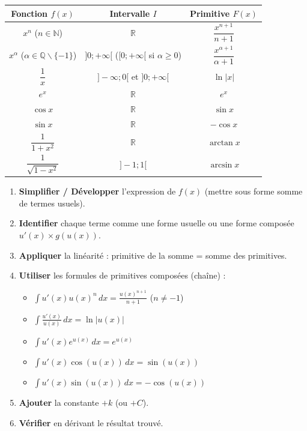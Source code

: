 \documentclass[11pt]{article}
\def\setminus{\mathbin{\backslash}}\let\smallsetminus\setminus
\begin{document}
\begin{aretenir}
\begin{center}
\begin{tabular}{|c|c|c|}\hline
Fonction $f(x)$ & Intervalle $I$ & Primitive $F(x)$ \\ \hline
$x^n$ ($n \in \mathbb{N}$) & $\mathbb{R}$ & $\dfrac{x^{n+1}}{n+1}$ \\ \hline
$x^\alpha$ ($\alpha \in \mathbb{Q}\setminus\{-1\}$) & $]0;+\infty[$ ($[0;+\infty[$ si $\alpha \ge 0$) & $\dfrac{x^{\alpha+1}}{\alpha+1}$ \\ \hline
$\dfrac{1}{x}$ & $]-\infty;0[$ et $]0;+\infty[$ & $\ln|x|$ \\ \hline
$e^x$ & $\mathbb{R}$ & $e^x$ \\ \hline
$\cos x$ & $\mathbb{R}$ & $\sin x$ \\ \hline
$\sin x$ & $\mathbb{R}$ & $-\cos x$ \\ \hline
$\dfrac{1}{1+x^2}$ & $\mathbb{R}$ & $\arctan x$ \\ \hline
$\dfrac{1}{\sqrt{1-x^2}}$ & $]-1;1[$ & $\arcsin x$ \\ \hline
\end{tabular}
\end{center}
\end{aretenir}

\begin{methode}
\begin{enumerate}
    \item \textbf{Simplifier / Développer} l'expression de $f(x)$ (mettre sous forme somme de termes usuels).
    \item \textbf{Identifier} chaque terme comme une forme usuelle ou une forme composée $u'(x) \times g(u(x))$.
    \item \textbf{Appliquer} la linéarité : primitive de la somme = somme des primitives.
    \item \textbf{Utiliser} les formules de primitives composées (chaîne) :
    \begin{itemize}
        \item $\int u'(x) u(x)^n \,dx = \frac{u(x)^{n+1}}{n+1}$ ($n \neq -1$)
        \item $\int \frac{u'(x)}{u(x)} \,dx = \ln|u(x)|$
        \item $\int u'(x) e^{u(x)} \,dx = e^{u(x)}$
        \item $\int u'(x) \cos(u(x)) \,dx = \sin(u(x))$
        \item $\int u'(x) \sin(u(x)) \,dx = -\cos(u(x))$
    \end{itemize}
    \item \textbf{Ajouter} la constante $+k$ (ou $+C$).
    \item \textbf{Vérifier} en dérivant le résultat trouvé.
\end{enumerate}
\end{methode}
\end{document}
